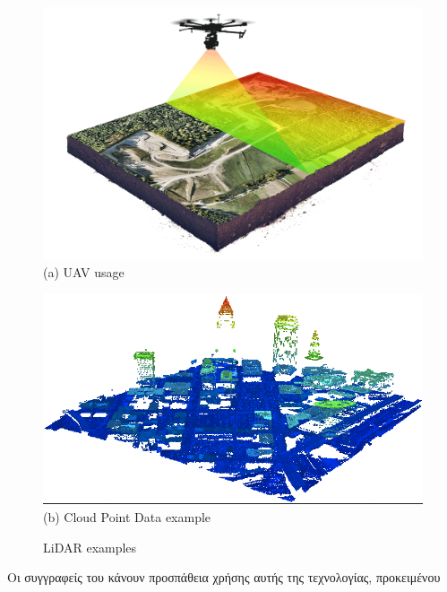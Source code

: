 \begin{figure} [H]
	\centering
		\begin{minipage}{.47\textwidth}
			\centering
			\includegraphics[width=.9\linewidth]{Images/Related-Work/lidar-drone-example.png}\\
			{(a) UAV usage }
		\end{minipage}%
		\hspace*{+0.8cm}
		\begin{minipage}{.47\textwidth}
			\centering
			\includegraphics[width=.9\linewidth]{Images/Related-Work/lidar-cloud.png}\\
			{(b) Cloud Point Data example }
		\end{minipage}
    \hfill \break
    \decoRule
	\caption[LiDAR examples]{LiDAR examples}
    \label{fig:drone-lidar}
\end{figure}

Οι συγγραφείς του \cite{lidar-usage-example} κάνουν προσπάθεια χρήσης αυτής της τεχνολογίας, προκειμένου 

